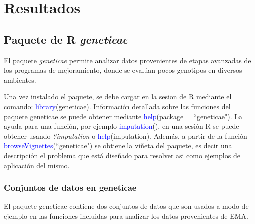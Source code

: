 

\chapter{Resultados}

\section{Paquete de R \emph{geneticae}}

El paquete \emph{geneticae} permite analizar datos provenientes de etapas avanzadas de los programas de mejoramiento, donde se evalúan pocos genotipos en diversos ambientes. 

Una vez instalado el paquete, se debe cargar en la sesion de R mediante el comando: \textcolor{blue}{library}(geneticae). Información detallada sobre las funciones del paquete geneticae se puede obtener mediante \textcolor{blue}{help}(package = ``geneticae"). La ayuda para una función, por ejemplo \textcolor{blue}{imputation}(), en una sesión R se puede obtener usando \emph{?imputation} o \textcolor{blue}{help}(imputation). Además, a partir de la función \textcolor{blue}{browseVignettes}(``geneticae") se obtiene la viñeta del paquete, es decir una descripción el problema que está diseñado para resolver asi como ejemplos de aplicación del mismo.

\subsection{Conjuntos de datos en geneticae}

El paquete geneticae contiene dos conjuntos de datos que son usados a modo de ejemplo en las funciones incluidas para analizar los datos provenientes de EMA.

